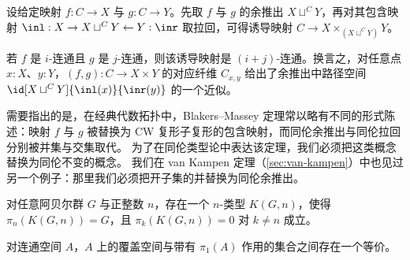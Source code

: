 %

\begin{thm}\label{Blakers-Massey}
  设给定映射 $f : C  \rightarrow X$ 与 $g : C \rightarrow Y$。先取 $f$ 与 $g$ 的余推出 $X \sqcup^C Y $，再对其包含映射 $\inl : X \rightarrow X \sqcup^C Y \leftarrow Y : \inr$ 取拉回，可得诱导映射 $C \to X \times_{(X \sqcup^C Y)} Y$。

  若 $f$ 是 $i$-连通且 $g$ 是 $j$-连通，则该诱导映射是 $(i+j)$-连通。换言之，对任意点 $x:X$、$y:Y$，$(f,g) : C \to X \times Y $ 的对应纤维 $C_{x,y}$ 给出了余推出中路径空间 $\id[X \sqcup^C Y]{\inl(x)}{\inr(y)}$ 的一个近似。
\end{thm}

需要指出的是，在经典代数拓扑中，Blakers--Massey 定理常以略有不同的形式陈述：映射 $f$ 与 $g$ 被替换为 CW 复形子复形的包含映射，而同伦余推出与同伦拉回分别被并集与交集取代。
为了在同伦类型论中表达该定理，我们必须把这类概念替换为同伦不变的概念。
我们在 van Kampen 定理（\cref{sec:van-kampen}）中也见过另一个例子：那里我们必须把开子集的并替换为同伦余推出。

\begin{thm}\label{Eilenberg-Mac-Lane-Spaces}
对任意阿贝尔群 $G$ 与正整数 $n$，存在一个 $n$-类型
$K(G,n)$，使得 $\pi_n(K(G,n)) = G$，且  $\pi_k(K(G,n)) = 0$
对 $k\neq n$ 成立。
\end{thm}

\begin{thm}[覆盖空间]\label{thm:covering-spaces}
  对连通空间 $A$，$A$ 上的覆盖空间与带有 $\pi_1(A)$ 作用的集合之间存在一个等价。
\end{thm}


\sectionNotes


